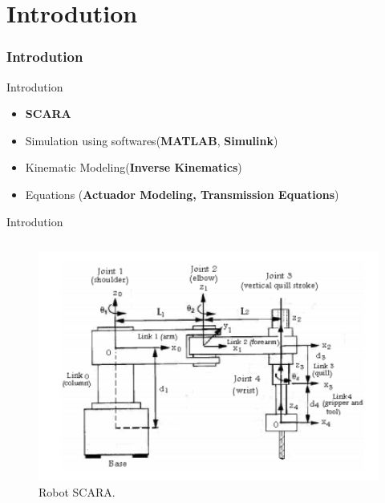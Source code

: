 \section{Introdution}
\frametitle{Introdution}

  \begin{frame}{Introdution}
    \begin{itemize}
      \item \textbf{SCARA}
      \item Simulation using softwares(\textbf{MATLAB}, \textbf{Simulink})
      \item Kinematic Modeling(\textbf{Inverse Kinematics})
      \item Equations (\textbf{Actuador Modeling, Transmission Equations})
    \end{itemize}

  \end{frame}

  \begin{frame}{Introdution}
    \begin{columns}

      \begin{column}{0.6\textwidth}
        \begin{figure}
          \centering
          \includegraphics[width=1.05\textwidth]{fig/SCARA.png}
          \caption{Robot SCARA.}
        \end{figure}
      \end{column}

    \end{columns}

  \end{frame}